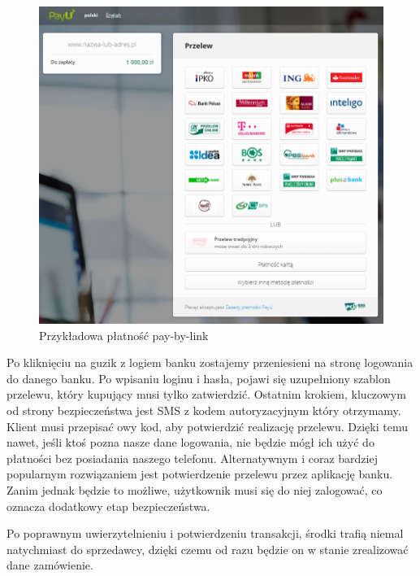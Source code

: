 \documentclass[12pt]{article}
\numberwithin{figure}{section}
\begin{document}
\begin{sloppypar}
\begin{figure}[!htbp] 
 	\centering
	\includegraphics[width=1\textwidth]{images/chapter_2/pay-by-link.png}
	\caption{Przykładowa płatność pay-by-link}
	\label{fig:pay-by-link}
\end{figure}

Po kliknięciu na guzik z logiem banku zostajemy przeniesieni na stronę logowania do danego banku. Po wpisaniu loginu i hasła, pojawi się uzupełniony szablon przelewu, który kupujący musi tylko zatwierdzić. Ostatnim krokiem, kluczowym od strony bezpieczeństwa jest SMS z kodem autoryzacyjnym który otrzymamy. Klient musi przepisać owy kod, aby potwierdzić realizację przelewu. Dzięki temu nawet, jeśli ktoś pozna nasze dane logowania, nie będzie mógł ich użyć do płatności bez posiadania naszego telefonu. Alternatywnym i coraz bardziej popularnym rozwiązaniem jest potwierdzenie przelewu przez aplikację banku. Zanim jednak będzie to możliwe, użytkownik musi się do niej zalogować, co oznacza dodatkowy etap bezpieczeństwa.

Po poprawnym uwierzytelnieniu i potwierdzeniu transakcji, środki trafią niemal natychmiast do sprzedawcy, dzięki czemu od razu będzie on w stanie zrealizować dane zamówienie.


\end{sloppypar}
\end{document}
